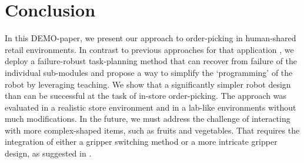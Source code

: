 \section{Conclusion} 
\label{sec:conclusion}

In this DEMO-paper, we present our approach to order-picking in human-shared
retail environments. In contrast to previous approaches for that application
\cite{toyota2023}, we deploy a failure-robust task-planning method that can
recover from failure of the individual sub-modules and propose a way to simplify
the `programming' of the robot by leveraging teaching. We show that a
significantly simpler robot design than \cite{toyota2023} can be successful at
the task of in-store order-picking. The approach was evaluated in a realistic store environment
and in a lab-like environments without much modifications. In the future, we
must address the challenge of interacting with more complex-shaped items, such
as fruits and vegetables. That requires the integration of either a gripper
switching method or a more intricate gripper design, as suggested in
\cite{toyota2023}.



